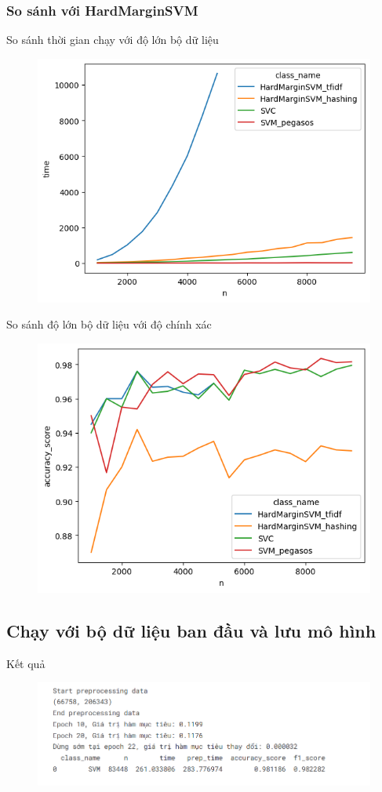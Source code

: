 \documentclass[serif, aspectratio=169]{beamer}
\begin{document}
	\subsubsection{So sánh với HardMarginSVM}
	\begin{frame}{So sánh thời gian chạy với độ lớn bộ dữ liệu}
		\begin{figure}
			\centering
			\includegraphics[width=0.6\linewidth]{pic/hardmargin-vs-pegasos-n-time.png}
			\label{fig:hardmargin-vs-pegasos-n-time.}
		\end{figure}
	\end{frame}
	
	\begin{frame}{So sánh độ lớn bộ dữ liệu với độ chính xác}
		\begin{figure}
			\centering
			\includegraphics[width=0.6\linewidth]{pic/hardmargin-vs-pegasos-n-vs-acc.png}
			\label{fig:hardmargin-vs-pegasos-n-vs-acc}
		\end{figure}
	\end{frame}
	\subsection{Chạy với bộ dữ liệu ban đầu và lưu mô hình}
	\begin{frame}{Kết quả}
		\begin{figure}
			\centering
			\includegraphics[width=1\linewidth]{pic/svm-pegasos-result-full.png}
			\label{fig:svm-pegasos-result-full}
		\end{figure}
	\end{frame}
	
\end{document}
